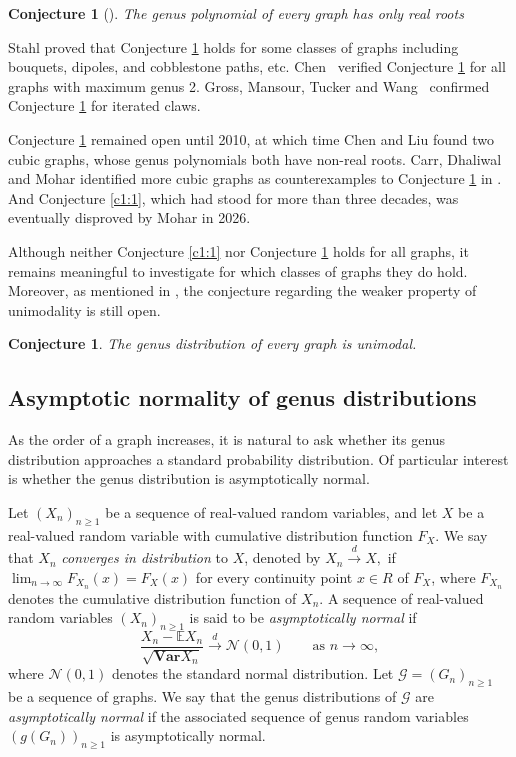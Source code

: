 \documentclass[12pt]{article}
\newtheorem{conjecture}[theorem]{Conjecture}
\theoremstyle{definition}
\newcommand{\expect}{\mathbb{E}} %
\newcommand{\var}{\mathbf{Var}} %
\newcommand{\convd}{\xrightarrow{d}} %
\newcommand{\normaldist}{\mathcal{N}} %
\newcommand{\graphseq}{\mathcal{G}} %
\begin{document}
\begin{conjecture}[\cite{Stahl}]\label{c1:2}
The genus polynomial of every graph has only real roots
\end{conjecture}

Stahl \cite{Stahl} proved that Conjecture \ref{c1:2} holds for some classes of
graphs including bouquets, dipoles, and cobblestone paths, etc. Chen~\cite{Chen08}  verified  Conjecture \ref{c1:2} for all graphs
with maximum genus 2.  Gross, Mansour, Tucker and Wang~\cite{Gross2016} confirmed Conjecture \ref{c1:2} for iterated claws.

Conjecture \ref{c1:2} remained open until 2010, at which time Chen and Liu
\cite{ChenLiu10} found two cubic graphs, whose genus polynomials both have
non-real roots. Carr, Dhaliwal and Mohar identified more cubic graphs as counterexamples to Conjecture \ref{c1:2} in \cite{CarrDhaliwalMohar2025}. And Conjecture \ref{c1:1}, which had stood for more than three decades, was eventually disproved by Mohar \cite{Mohar2026}  in 2026.

Although neither Conjecture \ref{c1:1} nor Conjecture \ref{c1:2} holds for all graphs, it remains meaningful to investigate for which classes of graphs they do hold. Moreover,
as mentioned in \cite{Mohar2026}, the conjecture regarding the weaker property of unimodality is still open.

\begin{conjecture}\label{c1:3}
The genus distribution of every graph is unimodal.
\end{conjecture}

\subsection{Asymptotic normality of genus distributions}
As the order of a graph increases, it is natural to ask whether its genus
distribution approaches a standard probability distribution. Of particular
interest is whether the genus distribution is asymptotically normal.

Let $(X_n)_{n\geq 1}$ be a sequence of real-valued random variables, and let $X$ be a real-valued random variable with cumulative distribution
function $F_X$. We say that $X_n$ \emph{converges in distribution} to $X$,
denoted by $X_n \convd X,$ if $
\lim_{n\to\infty} F_{X_n}(x)=F_X(x)
$ for every continuity point $x\in R$ of $F_X$, where $F_{X_n}$ denotes the cumulative distribution
function of $X_n$. A sequence of real-valued random variables $(X_n)_{n\geq 1}$ is said to be
\emph{asymptotically normal} if
$$
\frac{X_n-\expect X_n}{\sqrt{\var X_n}}
\convd \normaldist(0,1)
\qquad\text{as } n\to\infty,$$ where $\normaldist(0,1)$ denotes the standard normal distribution. Let $\graphseq=(G_n)_{n\geq 1}$ be a sequence of graphs. We say that the genus distributions of $\graphseq$ are \emph{asymptotically normal} if the associated sequence of genus random variables $(g(G_n))_{n\geq 1}$ is asymptotically normal.
\end{document}
